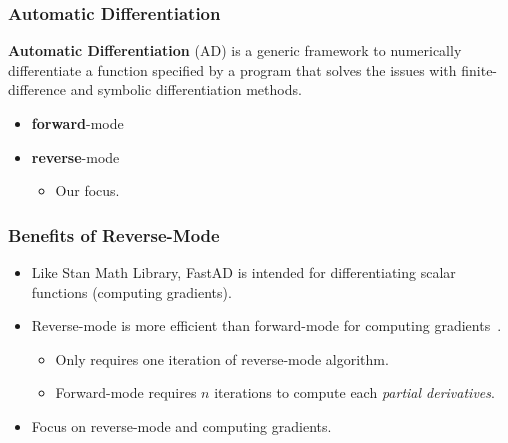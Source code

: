 \begin{frame}
\frametitle{Automatic Differentiation}
\textbf{Automatic Differentiation} (AD) is a generic framework to 
numerically differentiate a function specified by a program that 
solves the issues with finite-difference and symbolic differentiation methods.
\begin{itemize}
    \item \textbf{forward}-mode
    \item \textbf{reverse}-mode
        \begin{itemize}
            \item Our focus.
        \end{itemize}
\end{itemize}
\end{frame}

\begin{frame}
\frametitle{Benefits of Reverse-Mode}
\begin{itemize}
\item Like Stan Math Library, FastAD is intended for differentiating scalar functions (computing gradients).
\item Reverse-mode is more efficient than forward-mode for computing gradients~\cite{carpenter:2015}.
    \begin{itemize}
        \item Only requires one iteration of reverse-mode algorithm.
        \item Forward-mode requires $n$ iterations to compute each \emph{partial derivatives}.
    \end{itemize}
\item Focus on reverse-mode and computing gradients.
\end{itemize}
\end{frame}

